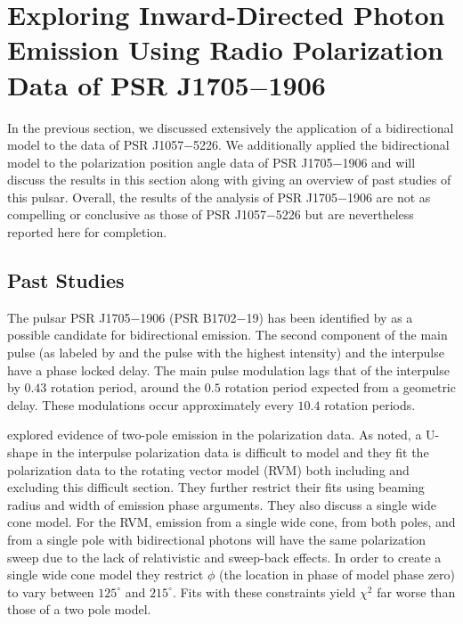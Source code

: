 \section{Exploring Inward-Directed Photon Emission Using Radio Polarization Data of PSR J1705$-$1906}

In the previous section, we discussed extensively the application
of a bidirectional model to the data of PSR J1057$-$5226.
We additionally applied the bidirectional model to the
polarization position angle data of PSR J1705$-$1906
and will discuss the results in this section along with
giving an overview of past studies of this pulsar.
Overall, the results of the analysis of 
PSR J1705$-$1906 are not as compelling or 
conclusive as those of PSR J1057$-$5226 but
are nevertheless reported here for completion.

\subsection{Past Studies}
The pulsar PSR J1705$-$1906 (PSR B1702$-$19) has been identified by \cite{weltevrede2007main}
as a possible candidate for bidirectional emission.
The second component of the main pulse (as labeled by \cite{weltevrede2007main} 
and the pulse with the highest intensity) and the interpulse 
have a phase locked delay.  The main pulse modulation lags that of the
interpulse by $0.43$ rotation period, around the $0.5$ rotation period expected from a geometric delay.
These modulations occur approximately every $10.4$ rotation periods.

\cite{weltevrede2007main} explored evidence of two-pole emission in the
polarization data.  As  \cite{weltevrede2007main} 
noted, a U-shape in the interpulse polarization
data is difficult to model and they fit the polarization
data to the rotating vector model (RVM) both including and excluding
this difficult section.
They further restrict their fits using beaming radius and
width of emission phase arguments.  They also
discuss a single wide cone model.  For the RVM, 
emission from a single wide cone, from both poles, and from a single
pole with bidirectional photons will
have the same polarization sweep due to the lack of relativistic and sweep-back effects.
In order to create a single wide cone model they restrict
$\phi$ (the location in phase of model phase zero) to 
vary between $125^\circ$ and $215^\circ$.  
Fits with these constraints yield $\chi^2$ far worse
than those of a two pole model.

